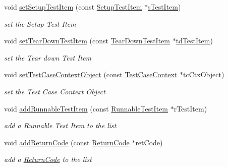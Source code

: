 \begin{DoxyCompactItemize}
void \hyperlink{classit_1_1testbench_1_1data_1_1TestCase_a6674ebc8f47ff4cb53cda5ec93c33a79}{set\-Setup\-Test\-Item} (const \hyperlink{classit_1_1testbench_1_1data_1_1SetupTestItem}{Setup\-Test\-Item} $\ast$\hyperlink{classit_1_1testbench_1_1data_1_1TestCase_ae1f04f1177b5a11841cedf052c270631}{s\-Test\-Item})
\begin{DoxyCompactList}\small\item\em set the Setup Test Item \end{DoxyCompactList}\item 
void \hyperlink{classit_1_1testbench_1_1data_1_1TestCase_a7a48241e8eb157c08eb136ef6f9a8d9e}{set\-Tear\-Down\-Test\-Item} (const \hyperlink{classit_1_1testbench_1_1data_1_1TearDownTestItem}{Tear\-Down\-Test\-Item} $\ast$\hyperlink{classit_1_1testbench_1_1data_1_1TestCase_a58c8c8823ed6c7521d1c47d621ba01d8}{td\-Test\-Item})
\begin{DoxyCompactList}\small\item\em set the Tear down Test Item \end{DoxyCompactList}\item 
void \hyperlink{classit_1_1testbench_1_1data_1_1TestCase_a06b8a0fb6f3f120b0ff42d95c505920e}{set\-Test\-Case\-Context\-Object} (const \hyperlink{classit_1_1testbench_1_1data_1_1TestCaseContext}{Test\-Case\-Context} $\ast$tc\-Ctx\-Object)
\begin{DoxyCompactList}\small\item\em set the Test Case Context Object \end{DoxyCompactList}\item 
void \hyperlink{classit_1_1testbench_1_1data_1_1TestCase_af941b63139874e7030b71eaa746946e3}{add\-Runnable\-Test\-Item} (const \hyperlink{classit_1_1testbench_1_1data_1_1RunnableTestItem}{Runnable\-Test\-Item} $\ast$r\-Test\-Item)
\begin{DoxyCompactList}\small\item\em add a Runnable Test Item to the list \end{DoxyCompactList}\item 
void \hyperlink{classit_1_1testbench_1_1data_1_1TestCase_aafe760d197ac5c9be1fb69a88ca02832}{add\-Return\-Code} (const \hyperlink{structit_1_1testbench_1_1data_1_1ReturnCode}{Return\-Code} $\ast$ret\-Code)
\begin{DoxyCompactList}\small\item\em add a \hyperlink{structit_1_1testbench_1_1data_1_1ReturnCode}{Return\-Code} to the list \end{DoxyCompactList}\item 

\end{DoxyCompactItemize}
